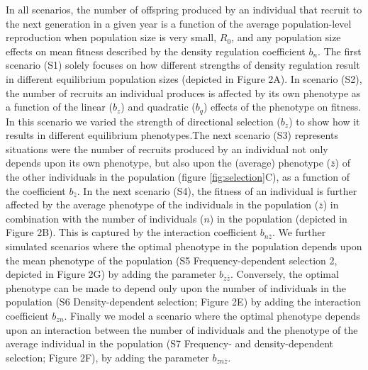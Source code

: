 \documentclass{article}
\begin{document}
 In all scenarios, the number of offspring produced by an individual that recruit to the next generation in a given year is a function of the average population-level reproduction when population size is very small, $R_0$, and any population size effects on mean fitness described by the density regulation coefficient $b_{n}$. The first scenario (S1) solely focuses on how different strengths of density regulation result in different equilibrium population sizes (depicted in Figure 2A). In scenario (S2), the number of recruits an individual produces is affected by its own phenotype as a function of the linear ($b_z$) and quadratic ($b_q$) effects of the phenotype on fitness. In this scenario we varied the strength of directional selection ($b_z$) to show how it results in different equilibrium phenotypes.The next scenario (S3) represents situations were the number of recruits produced by an individual not only depends upon its own phenotype, but also upon the (average) phenotype ($\bar{z}$) of the other individuals in the population (figure \ref{fig:selection}C), as a function of the coefficient $b_{\bar{z}}$. In the next scenario (S4), the fitness of an individual is further affected by the average phenotype of the individuals in the population ($\bar{z}$) in combination with the number of individuals ($n$) in the population (depicted in Figure 2B). This is captured by the interaction coefficient $b_{n\bar{z}}$. We further simulated scenarios where the optimal phenotype in the population depends upon the mean phenotype of the population (S5 Frequency-dependent selection 2, depicted in Figure 2G) by adding the parameter $b_{z\bar{z}}$. Conversely, the optimal phenotype can be made to depend only upon the number of individuals in the population (S6 Density-dependent selection; Figure 2E) by adding the interaction coefficient $b_{zn}$. Finally we model a scenario where the optimal phenotype depends upon an interaction between the number of individuals and the phenotype of the average individual in the population (S7 Frequency- and density-dependent selection; Figure 2F), by adding the parameter $b_{zn\bar{z}}$.
 
\end{document}
